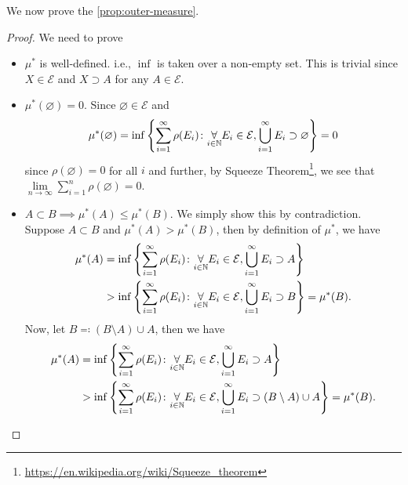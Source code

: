 \begin{prev}
	We now prove the \autoref{prop:outer-measure}.
\end{prev}
\begin{proof}
	We need to prove
	\begin{itemize}
		\item \(\mu^{*} \) is well-defined. i.e., \(\inf\) is taken over a non-empty set. This is trivial since \(X\in \mathcal{E}\) and \(X\supset A\) for any \(A\in \mathcal{E}\).
		\item \(\mu^{*} (\varnothing ) = 0\). Since \(\varnothing \in \mathcal{E}\) and
		      \[
			      \mu^{*} (\varnothing ) = \inf \left\{\sum\limits_{i=1}^{\infty} \rho(E_{i})\colon \underset{i\in \mathbb{\MakeUppercase{N}} }{\forall}E_{i}\in \mathcal{E} , \bigcup\limits_{i=1}^{\infty} E_{i}\supset \varnothing \right\} = 0
		      \]
		      since \(\rho(\varnothing ) = 0\) for all \(i\) and further, by Squeeze Theorem\footnote{\url{https://en.wikipedia.org/wiki/Squeeze_theorem}}, we see that \(\lim\limits_{n \to \infty} \sum\limits_{i=1}^{n} \rho(\varnothing) = 0\).
		\item \(A\subset B\implies \mu^{*} (A)\leq \mu^{*} (B)\). We simply show this by contradiction. Suppose \(A\subset B\) and \(\mu^{*} (A)>  \mu^{*} (B)\), then by
		      definition of \(\mu^{*} \), we have
		      \[
			      \begin{split}
				      \mu^{*} (A) &= \inf\left\{\sum\limits_{i=1}^{\infty} \rho(E_{i})\colon \underset{i\in\mathbb{\MakeUppercase{N}}}{\forall}E_{i}\in \mathcal{E},\bigcup\limits_{i=1}^{\infty} E_{i}\supset A \right\}\\
				      &>\inf\left\{\sum\limits_{i=1}^{\infty} \rho(E_{i})\colon \underset{i\in\mathbb{\MakeUppercase{N}}}{\forall}E_{i}\in \mathcal{E},\bigcup\limits_{i=1}^{\infty} E_{i}\supset B \right\} = \mu^{*} (B).
			      \end{split}
		      \]
		      Now, let \(B \eqqcolon (B\setminus A)\cup A\), then we have
		      \[
			      \begin{split}
				      \mu^{*} (A) &= \inf\left\{\sum\limits_{i=1}^{\infty} \rho(E_{i})\colon \underset{i\in\mathbb{\MakeUppercase{N}}}{\forall}E_{i}\in \mathcal{E},\bigcup\limits_{i=1}^{\infty} E_{i}\supset A \right\}\\
				      &>\inf\left\{\sum\limits_{i=1}^{\infty} \rho(E_{i})\colon \underset{i\in\mathbb{\MakeUppercase{N}}}{\forall}E_{i}\in \mathcal{E},\bigcup\limits_{i=1}^{\infty} E_{i}\supset (B\setminus A)\cup A \right\} = \mu^{*} (B).

\end{split}\]
\end{itemize}
\end{proof}

